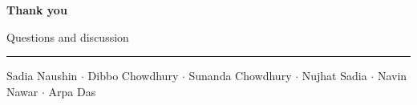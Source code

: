 \documentclass[10pt,aspectratio=169,t]{beamer}
\begin{document}
{
\begin{frame}[c]
  \noindent
  {\color{ink}\huge\bfseries Thank you}\par\vspace{0.4em}
  {\color{inktwo}\large Questions and discussion}\par\vspace{0.8em}
  {\color{rulegrey}\rule{0.5\linewidth}{0.8pt}}\par\vspace{0.5em}
  {\small\color{inktwo} Sadia Naushin $\cdot$ Dibbo Chowdhury $\cdot$ Sunanda Chowdhury $\cdot$ Nujhat Sadia $\cdot$ Navin Nawar $\cdot$ Arpa Das}
\end{frame}
}
\end{document}
